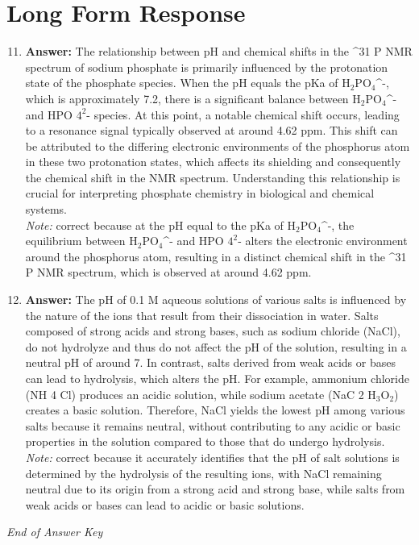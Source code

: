 \documentclass[12pt]{article}
\begin{document}
\section*{Long Form Response}
\begin{enumerate}[label=\arabic*.]
\setcounter{enumi}{10}
\item \textbf{Answer:} The relationship between pH and chemical shifts in the ^31 P NMR spectrum of sodium phosphate is primarily influenced by the protonation state of the phosphate species. When the pH equals the pKa of H$_{2}$PO$_{4}$^-, which is approximately 7.2, there is a significant balance between H$_{2}$PO$_{4}$^- and HPO $4^2$- species. At this point, a notable chemical shift occurs, leading to a resonance signal typically observed at around 4.62 ppm. This shift can be attributed to the differing electronic environments of the phosphorus atom in these two protonation states, which affects its shielding and consequently the chemical shift in the NMR spectrum. Understanding this relationship is crucial for interpreting phosphate chemistry in biological and chemical systems.
\\ \textit{Note:} correct because at the pH equal to the pKa of H$_{2}$PO$_{4}$^-, the equilibrium between H$_{2}$PO$_{4}$^- and HPO $4^2$- alters the electronic environment around the phosphorus atom, resulting in a distinct chemical shift in the ^31 P NMR spectrum, which is observed at around 4.62 ppm.
\item \textbf{Answer:} The pH of 0.1 M aqueous solutions of various salts is influenced by the nature of the ions that result from their dissociation in water. Salts composed of strong acids and strong bases, such as sodium chloride (NaCl), do not hydrolyze and thus do not affect the pH of the solution, resulting in a neutral pH of around 7. In contrast, salts derived from weak acids or bases can lead to hydrolysis, which alters the pH. For example, ammonium chloride (NH 4 Cl) produces an acidic solution, while sodium acetate (NaC 2 H$_{3}$O$_{2}$) creates a basic solution. Therefore, NaCl yields the lowest pH among various salts because it remains neutral, without contributing to any acidic or basic properties in the solution compared to those that do undergo hydrolysis.
\\ \textit{Note:} correct because it accurately identifies that the pH of salt solutions is determined by the hydrolysis of the resulting ions, with NaCl remaining neutral due to its origin from a strong acid and strong base, while salts from weak acids or bases can lead to acidic or basic solutions.
\end{enumerate}

\vfill
\noindent\textit{End of Answer Key}
\end{document}
